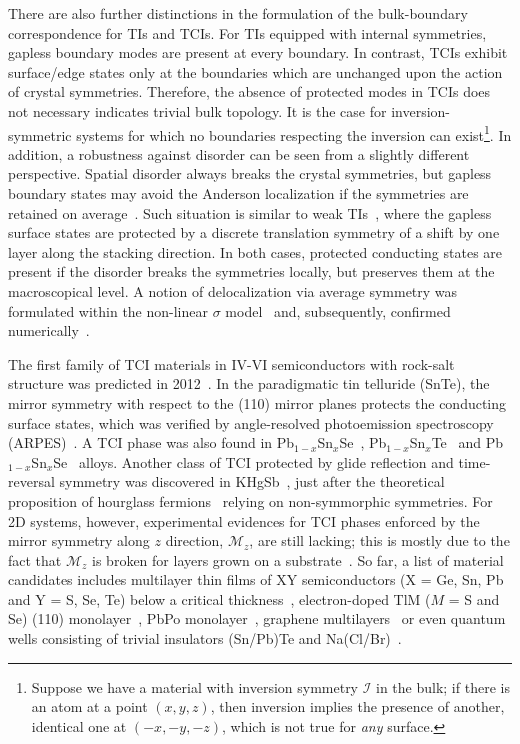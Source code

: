 There are also further distinctions in the formulation of the bulk-boundary correspondence for TIs and TCIs. For TIs equipped with internal symmetries, gapless boundary modes are present at every boundary. In contrast, TCIs exhibit surface/edge states only at the boundaries which are unchanged upon the action of crystal symmetries. Therefore, the absence of protected modes in TCIs does not necessary indicates trivial bulk topology. It is the case for inversion-symmetric systems for which no boundaries respecting the inversion can exist\footnote{Suppose we have a material with inversion symmetry $\mathcal{I}$ in the bulk; if there is an atom at a point $(x, y, z)$, then inversion implies the presence of another, identical one at $(-x, -y, -z)$, which is not true for \emph{any} surface.}. In addition, a robustness against disorder can be seen from a slightly different perspective. Spatial disorder always breaks the crystal symmetries, but gapless boundary states may avoid the Anderson localization if the symmetries are retained on average~\cite{Diez_2015, PhysRevB.88.125129}. Such situation is similar to weak TIs~\cite{PhysRevLett.98.106803}, where the gapless surface states are protected by a discrete translation symmetry of a shift by one layer along the stacking direction. In both cases, protected conducting states are present if the disorder breaks the symmetries locally, but preserves them at the macroscopical level. A notion of delocalization via average symmetry was formulated within the non-linear $\sigma$ model~\cite{fu2012topology} and, subsequently, confirmed numerically~\cite{PhysRevLett.108.076804, PhysRevLett.110.236803, PhysRevB.89.155315}.

The first family of TCI materials in IV-VI semiconductors with rock-salt structure was predicted in 2012~\cite{HsiehTCI2012}. In the paradigmatic tin telluride (SnTe), the mirror symmetry with respect to the (110) mirror planes protects the conducting surface states, which was verified by angle-resolved photoemission spectroscopy (ARPES)~\cite{Tanaka2012}. A TCI phase was also found in Pb$_{1-x}$Sn$_x$Se~\cite{Dziawa2012}, Pb$_{1-x}$Sn$_x$Te~\cite{Xu2012, PhysRevB.87.155105} and Pb$_{1-x}$Sn$_{x}$Se~\cite{PhysRevB.87.115106} alloys. Another class of TCI protected by glide reflection and time-reversal symmetry was discovered in KHgSb~\cite{Mae1602415}, just after the theoretical proposition of hourglass fermions~\cite{Wang2016} relying on non-symmorphic symmetries. For 2D systems, however, experimental evidences for TCI phases enforced by the mirror symmetry along $z$ direction, $\mathcal{M}_z$, are still lacking; this is mostly due to the fact that $\mathcal{M}_z$ is broken for layers grown on a substrate~\cite{Shen2014}. So far, a list of material candidates includes multilayer thin films of XY semiconductors (X = Ge, Sn, Pb and Y = S, Se, Te) below a critical thickness~\cite{Liu2014, PhysRevB.90.045309, C7CP04679K}, electron-doped TlM ($M$ = S and Se) (110) monolayer~\cite{Niu2015}, PbPo monolayer~\cite{C6TC03197H}, graphene multilayers~\cite{PhysRevLett.114.226802} or even quantum wells consisting of trivial insulators (Sn/Pb)Te and Na(Cl/Br)~\cite{Niu_2016}. 

